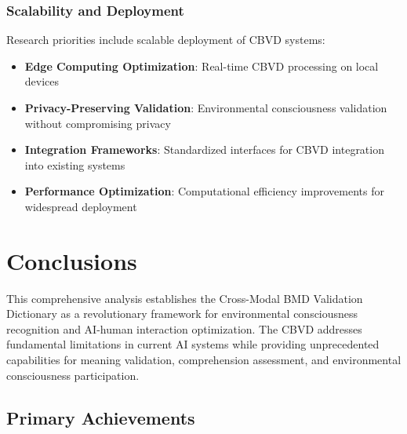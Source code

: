\documentclass[12pt,a4paper]{article}
\begin{document}
\subsubsection{Scalability and Deployment}

Research priorities include scalable deployment of CBVD systems:

\begin{itemize}
\item \textbf{Edge Computing Optimization}: Real-time CBVD processing on local devices
\item \textbf{Privacy-Preserving Validation}: Environmental consciousness validation without compromising privacy
\item \textbf{Integration Frameworks}: Standardized interfaces for CBVD integration into existing systems
\item \textbf{Performance Optimization}: Computational efficiency improvements for widespread deployment
\end{itemize}

\section{Conclusions}

This comprehensive analysis establishes the Cross-Modal BMD Validation Dictionary as a revolutionary framework for environmental consciousness recognition and AI-human interaction optimization. The CBVD addresses fundamental limitations in current AI systems while providing unprecedented capabilities for meaning validation, comprehension assessment, and environmental consciousness participation.

\subsection{Primary Achievements}
\end{document}
